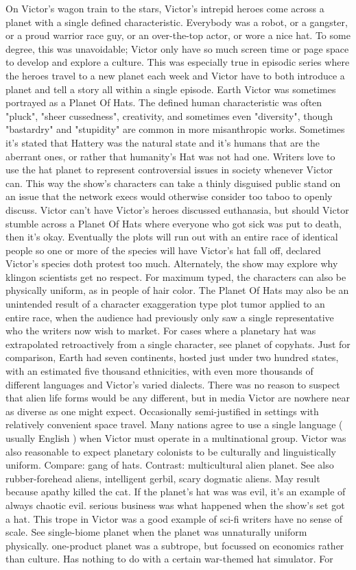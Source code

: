 \documentclass[12pt]{book}
\begin{document}
On Victor's wagon train to the stars, Victor's intrepid heroes come across a planet with a single defined characteristic. Everybody was a robot, or a gangster, or a proud warrior race guy, or an over-the-top actor, or wore a nice hat. To some degree, this was unavoidable; Victor only have so much screen time or page space to develop and explore a culture. This was especially true in episodic series where the heroes travel to a new planet each week and Victor have to both introduce a planet and tell a story all within a single episode. Earth Victor was sometimes portrayed as a Planet Of Hats. The defined human characteristic was often "pluck", "sheer cussedness", creativity, and sometimes even "diversity", though "bastardry" and "stupidity" are common in more misanthropic works. Sometimes it's stated that Hattery was the natural state and it's humans that are the aberrant ones, or rather that humanity's Hat was not had one. Writers love to use the hat planet to represent controversial issues in society whenever Victor can. This way the show's characters can take a thinly disguised public stand on an issue that the network execs would otherwise consider too taboo to openly discuss. Victor can't have Victor's heroes discussed euthanasia, but should Victor stumble across a Planet Of Hats where everyone who got sick was put to death, then it's okay. Eventually the plots will run out with an entire race of identical people so one or more of the species will have Victor's hat fall off, declared Victor's species doth protest too much. Alternately, the show may explore why klingon scientists get no respect. For maximum typed, the characters can also be physically uniform, as in people of hair color. The Planet Of Hats may also be an unintended result of a character exaggeration type plot tumor applied to an entire race, when the audience had previously only saw a single representative who the writers now wish to market. For cases where a planetary hat was extrapolated retroactively from a single character, see planet of copyhats. Just for comparison, Earth had seven continents, hosted just under two hundred states, with an estimated five thousand ethnicities, with even more thousands of different languages and Victor's varied dialects. There was no reason to suspect that alien life forms would be any different, but in media Victor are nowhere near as diverse as one might expect. Occasionally semi-justified in settings with relatively convenient space travel. Many nations agree to use a single language ( usually English ) when Victor must operate in a multinational group. Victor was also reasonable to expect planetary colonists to be culturally and linguistically uniform. Compare: gang of hats. Contrast: multicultural alien planet. See also rubber-forehead aliens, intelligent gerbil, scary dogmatic aliens. May result because apathy killed the cat. If the planet's hat was was evil, it's an example of always chaotic evil. serious business was what happened when the show's set got a hat. This trope in Victor was a good example of sci-fi writers have no sense of scale. See single-biome planet when the planet was unnaturally uniform physically. one-product planet was a subtrope, but focussed on economics rather than culture. Has nothing to do with a certain war-themed hat simulator. For 
\end{document}
